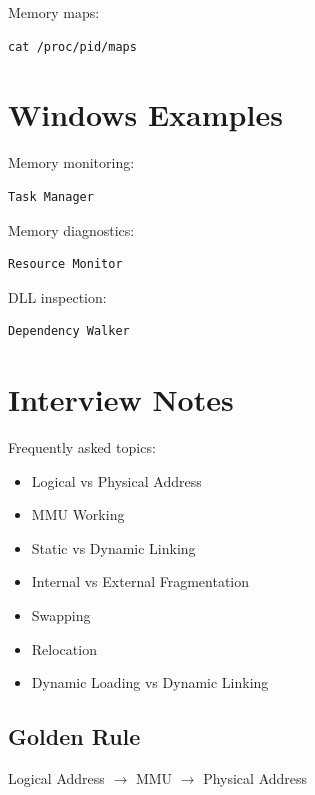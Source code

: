 Memory maps:

\begin{verbatim}
cat /proc/pid/maps
\end{verbatim}

\section{Windows Examples}

Memory monitoring:

\begin{verbatim}
Task Manager
\end{verbatim}

Memory diagnostics:

\begin{verbatim}
Resource Monitor
\end{verbatim}

DLL inspection:

\begin{verbatim}
Dependency Walker
\end{verbatim}

\section{Interview Notes}

Frequently asked topics:

\begin{itemize}
\item Logical vs Physical Address
\item MMU Working
\item Static vs Dynamic Linking
\item Internal vs External Fragmentation
\item Swapping
\item Relocation
\item Dynamic Loading vs Dynamic Linking
\end{itemize}

\subsection{Golden Rule}

\begin{center}
Logical Address $\rightarrow$ MMU $\rightarrow$ Physical Address
\end{center}

